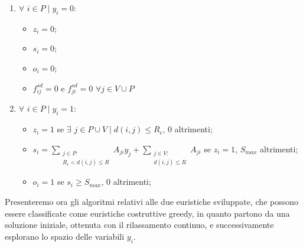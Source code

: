 \begin{enumerate}
	\item $\forall$ $i \in P \mid y_i = 0$:
	\begin{itemize}
		\item $z_i = 0$;
		\item $s_i = 0$;
		\item $o_i = 0$; 
		\item $f_{ij}^{sd} = 0$ e $f_{ji}^{sd} = 0$    $\forall j \in V \cup P$
	\end{itemize} 
	\item $\forall$ $i \in P \mid y_i = 1$:
	\begin{itemize}
		\item $z_i = 1$ se $\exists$ $j \in P \cup V \mid d(i,j) \leq R_\epsilon$, 0 altrimenti;
		\item $s_i = \sum\limits_{\substack{j \in P :\\ R_{\epsilon} < d(i,j) \le R} } A_{ji} y_{j} + \sum\limits_{\substack{j \in V :\\ d(i,j) \le R }} A_{ji}$ se $z_i = 1$, $S_{max}$ altrimenti;
		\item $o_i = 1$ se $s_i \geq S_{max}$, 0 altrimenti; 
	\end{itemize} 
\end{enumerate} 
Presenteremo ora gli algoritmi relativi alle due euristiche sviluppate, che possono essere classificate come euristiche costruttive greedy, in quanto partono da una soluzione iniziale, ottenuta con il rilassamento continuo, e successivamente esplorano lo spazio delle variabili $y_i$.

